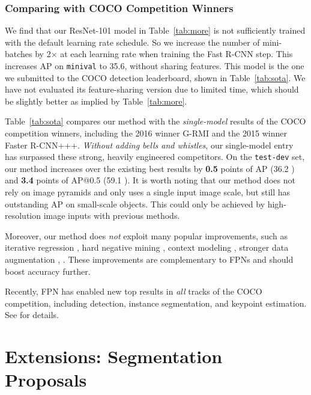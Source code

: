 \documentclass[10pt,twocolumn,letterpaper]{article}
\begin{document}
\subsubsection{Comparing with COCO Competition Winners}

We find that our ResNet-101 model in Table~\ref{tab:more} is not sufficiently trained with the default learning rate schedule.
So we increase the number of mini-batches by 2$\times$ at each learning rate when training the Fast R-CNN step. This increases AP on \texttt{minival} to 35.6, without sharing features.
This model is the one we submitted to the COCO detection leaderboard, shown in Table~\ref{tab:sota}.
We have not evaluated its feature-sharing version due to limited time, which should be slightly better as implied by Table~\ref{tab:more}.

Table~\ref{tab:sota} compares our method with the \emph{single-model} results of the COCO competition winners, including the 2016 winner G-RMI and the 2015 winner Faster R-CNN+++.
\emph{Without adding bells and whistles}, our single-model entry has surpassed these strong, heavily engineered competitors.
On the \texttt{test-dev} set, our method increases over the existing best results by \textbf{0.5} points of AP (36.2 ) and \textbf{3.4} points of AP@0.5 (59.1 ).
It is worth noting that our method does not rely on image pyramids and only uses a single input image scale, but still has outstanding AP on small-scale objects. This could only be achieved by high-resolution image inputs with previous methods.

Moreover, our method does \emph{not} exploit many popular improvements, such as iterative regression \cite{Gidaris2015}, hard negative mining \cite{Shrivastava2016}, context modeling \cite{He2016}, stronger data augmentation \cite{Liu2016}, \etc.
These improvements are complementary to FPNs and should boost accuracy further.

Recently, FPN has enabled new top results in \emph{all} tracks of the COCO competition, including detection, instance segmentation, and keypoint estimation. See \cite{he2017mask} for details.

\section{Extensions: Segmentation Proposals}
\label{sec:segment}
\end{document}
